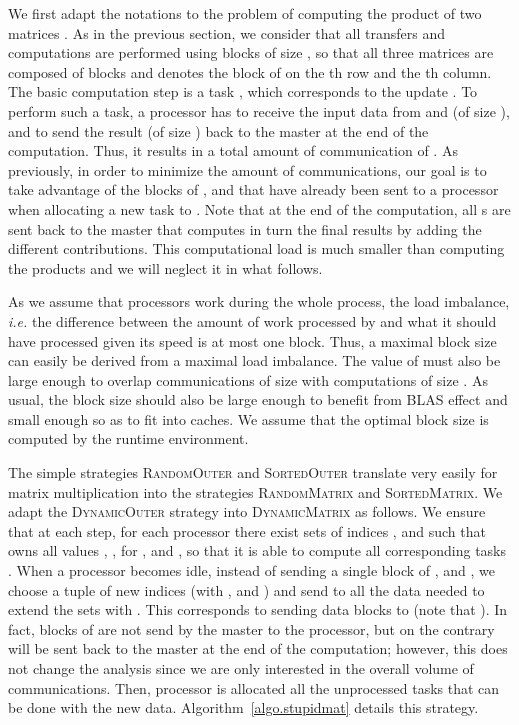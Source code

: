 \documentclass[a4paper,10pt]{article}
\newcommand{\ie}{{\it i.e.}\xspace}
\newcommand{\simplerandom}{\textsc{Random\-Outer}\xspace}
\newcommand{\simplesorted}{\textsc{Sorted\-Outer}\xspace}
\newcommand{\stupid}{\textsc{Dynamic\-Outer}\xspace}
\newcommand{\simplerandommat}{\textsc{Random\-Matrix}\xspace}
\newcommand{\simplesortedmat}{\textsc{Sorted\-Matrix}\xspace}
\newcommand{\stupidmat}{\textsc{Dynamic\-Matrix}\xspace}
\begin{document}
We first adapt the notations to the problem of computing the product
of two matrices . As in the previous section, we consider
that all transfers and computations are performed using blocks of size
, so that all three matrices are composed of 
blocks and  denotes the block of  on the th row and the
th column. The basic computation step is a task , which
corresponds to the update . To perform such a task, a processor has to receive the input
data from  and  (of size ), and to send the result (of
size ) back to the master at the end of the
computation. Thus, it results in a total amount of communication of
. As previously, in order to minimize the amount of
communications, our goal is to take advantage of the blocks of ,
 and  that have already been sent to a processor  when
allocating a new task to . Note that at the end of the
computation, all s are sent back to the master that computes
in turn the final results by adding the different contributions. This
computational load is much smaller than computing the products
 and we will neglect it in what follows. 


As we assume that processors work during the whole process, the load
imbalance, \ie the difference between the amount of work processed by
 and what it should have processed given its speed is at most one
block. Thus, a maximal block size  can easily be derived from a
maximal load imbalance. The value of  must also be large enough to
overlap communications of size  with computations of size
.  As usual, the block size should also be large enough to
benefit from BLAS effect and small enough so as to fit into caches. We
assume that the optimal block size  is computed by the runtime
environment.
\medskip


The simple strategies \simplerandom and \simplesorted translate very
easily for matrix multiplication into the strategies \simplerandommat
and \simplesortedmat. We adapt the \stupid strategy into \stupidmat as
follows. We ensure that at each step, for each processor  there
exist sets of indices ,  and  such that  owns all values
, ,  for ,  and ,
so that it is able to compute all corresponding tasks
. When a processor becomes idle, instead of sending a
single block of ,  and , we choose a tuple  of new
indices (with  ,  and ) and send to
 all the data needed to extend the sets  with
. This corresponds to sending  data blocks to
 (note that ). In fact, blocks of
 are not send by the master to the processor, but on the contrary
will be sent back to the master at the end of the computation; however,
this does not change the analysis since we are only interested in the
overall volume of communications. Then, processor  is allocated
all the unprocessed tasks that can be done with the new
data. Algorithm~\ref{algo.stupidmat} details this strategy.
\end{document}
